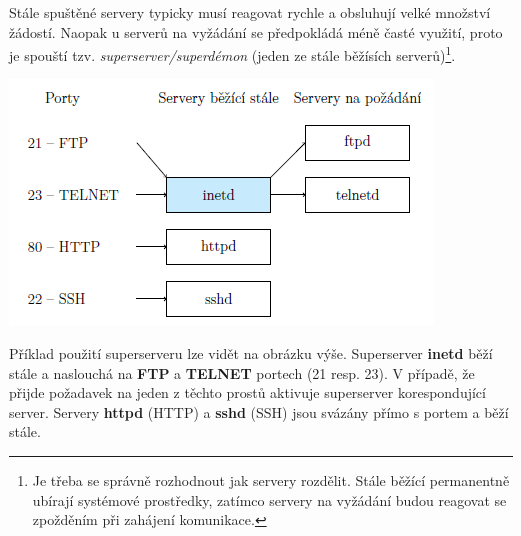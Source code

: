 Stále spuštěné servery typicky musí reagovat rychle a obsluhují velké množství žádostí. Naopak u serverů na vyžádání se předpokládá méně časté využití, proto je spouští tzv. \textit{superserver/superdémon} (jeden ze stále běžísích serverů)\footnote{Je třeba se správně rozhodnout jak servery rozdělit. Stále běžící permanentně ubírají systémové prostředky, zatímco servery na vyžádání budou reagovat se zpožděním při zahájení komunikace.}.

\begin{center}
    \vspace{0,5cm}
    \includegraphics[scale=1]{images/network_server_proc.png}
\end{center}

Příklad použití superserveru lze vidět na obrázku výše. Superserver \textbf{inetd} běží stále a naslouchá na \textbf{FTP} a \textbf{TELNET} portech (21 resp. 23). V případě, že přijde požadavek na jeden z těchto prostů aktivuje superserver korespondující server. Servery \textbf{httpd} (HTTP) a \textbf{sshd} (SSH) jsou svázány přímo s portem a běží stále.


